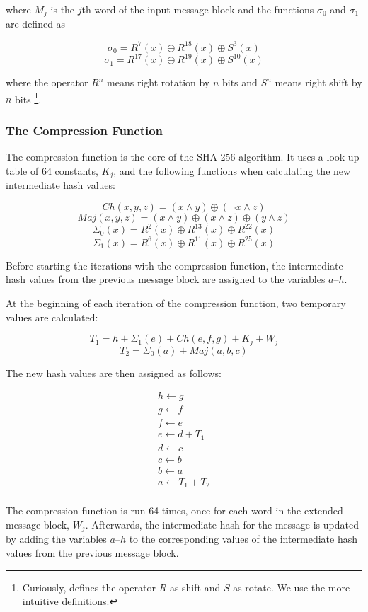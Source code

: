\noindent where $M_j$ is the $j$th word of the input message block and the functions
$\sigma_0$ and $\sigma_1$ are defined as

\[\sigma_0 = R^7(x) \oplus R^{18}(x) \oplus S^3(x)\]
\[\sigma_1 = R^{17}(x) \oplus R^{19}(x) \oplus S^{10}(x)\]

\noindent where the operator $R^n$ means right rotation by $n$ bits and $S^n$ means right shift by $n$
bits \footnote{Curiously, \cite{sha-spec} defines the operator $R$ as shift and $S$ as rotate.
We use the more intuitive definitions.}.

\subsubsection{The Compression Function}
\label{sec:sha-compr}
The compression function is the core of the SHA-256 algorithm. It uses a look-up table
of 64 constants, $K_j$, and the following functions when calculating the new intermediate
hash values:

\[Ch(x,y,z) = (x \wedge y) \oplus (\neg x \wedge z)\]
\[Maj(x, y, z) = (x \wedge y) \oplus (x \wedge z) \oplus (y \wedge z)\]
\[\Sigma_0(x) = R^2(x) \oplus R^{13}(x) \oplus R^{22}(x)\]
\[\Sigma_1(x) = R^6(x) \oplus R^{11}(x) \oplus R^{25}(x)\]

Before starting the iterations with the compression function, the intermediate
hash values from the previous message block are assigned to the variables $a$--$h$.

At the beginning of each iteration of the compression function, two temporary
values are calculated:

\[T_1 = h + \Sigma_1(e) + Ch(e, f, g) + K_j + W_j\]
\[T_2 = \Sigma_0(a) + Maj(a, b, c)\]

The new hash values are then assigned as follows:

\[\begin{array}{l}
	h \leftarrow g \\
	g \leftarrow f \\
	f \leftarrow e \\
	e \leftarrow d + T_1\\
	d \leftarrow c \\
	c \leftarrow b \\
	b \leftarrow a \\
	a \leftarrow T_1 + T_2 \\
\end{array}\]

The compression function is run 64 times, once for each word in the extended message block,
$W_j$. Afterwards, the intermediate hash for the message is updated by adding the
variables $a$--$h$ to the corresponding values of the intermediate hash values from
the previous message block.

